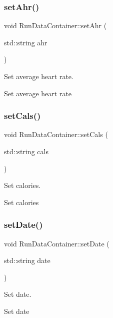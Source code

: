 \subsubsection{\texorpdfstring{setAhr()}{setAhr()}}
{\footnotesize\ttfamily void Run\+Data\+Container\+::set\+Ahr (\begin{DoxyParamCaption}\item[{std\+::string}]{ahr }\end{DoxyParamCaption})}



Set average heart rate. 

Set average heart rate \mbox{\label{classRunDataContainer_ad45c3d94c2db1e3be8716ac04e07990a}} 
\subsubsection{\texorpdfstring{setCals()}{setCals()}}
{\footnotesize\ttfamily void Run\+Data\+Container\+::set\+Cals (\begin{DoxyParamCaption}\item[{std\+::string}]{cals }\end{DoxyParamCaption})}



Set calories. 

Set calories \mbox{\label{classRunDataContainer_a15faf13321d882722b0161265da14b3e}} 
\subsubsection{\texorpdfstring{setDate()}{setDate()}}
{\footnotesize\ttfamily void Run\+Data\+Container\+::set\+Date (\begin{DoxyParamCaption}\item[{std\+::string}]{date }\end{DoxyParamCaption})}



Set date. 

Set date \mbox{\label{classRunDataContainer_ab33726fac3656f80cf6d43bd195e0914}} 
